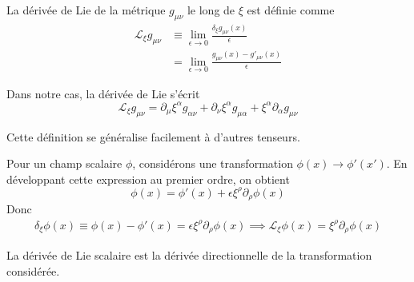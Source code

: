\begin{theoremframe}
    \begin{defi}
        La dérivée de Lie de la métrique $g_{\mu \nu}$ le long de $\xi$ est définie comme
        \begin{align}
            \mathcal{L}_{\xi}g_{\mu \nu} &\equiv \lim_{\epsilon \rightarrow 0} \frac{\delta_{\xi}g_{\mu \nu}(x)}{\epsilon}\\
            &= \lim_{\epsilon \rightarrow 0} \frac{g_{\mu \nu}(x) - g'_{\mu \nu}(x)}{\epsilon}
        \end{align}
    \end{defi}
\end{theoremframe}

Dans notre cas, la dérivée de Lie s'écrit
\begin{equation}
    \boxed{\mathcal{L}_{\xi}g_{\mu \nu} = \partial_{\mu}\xi^{\alpha}g_{\alpha \nu} + \partial_{\nu}\xi^{\alpha}g_{\mu \alpha} + \xi^{\alpha}\partial_{\alpha}g_{\mu \nu}}
\end{equation}

Cette définition se généralise facilement à d'autres tenseurs.
\begin{exmp}
    Pour un champ scalaire $\phi$, considérons une transformation $\phi(x) \to \phi'(x')$. En développant cette expression au premier ordre, on obtient
    \begin{equation}
        \phi (x) = \phi '(x) + \epsilon \xi^{\rho}\partial_{\rho}\phi(x)
    \end{equation}
    Donc
    \begin{align}
        \delta_{\xi}\phi(x) \equiv \phi(x) - \phi'(x) = \epsilon\xi^{\rho}\partial_{\rho}\phi(x)\implies \mathcal{L}_{\xi}\phi(x) = \xi^{\rho}\partial_{\rho}\phi(x)
    \end{align}

La dérivée de Lie scalaire est la dérivée directionnelle de la transformation considérée. 
\end{exmp}
